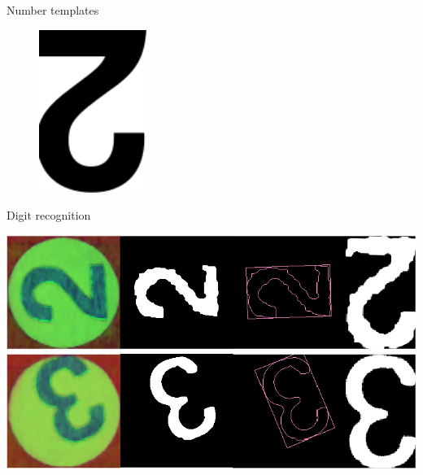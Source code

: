 \begin{frame}[fragile]{Number templates}
\begin{figure}[H]
\begin{minipage}{0.40\linewidth}
			\includegraphics[width=\linewidth]{Immagini/2_inv.png}
		\end{minipage}
	\end{figure}
\end{frame}

\begin{frame}[fragile]{Digit recognition}
\begin{center}
	\includegraphics[width=\linewidth]{Immagini/nn2}\\
	\includegraphics[width=\linewidth]{Immagini/nn3}
\end{center} 
\end{frame}


